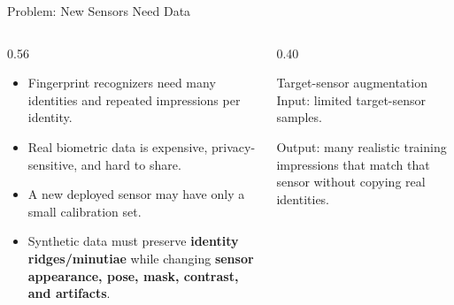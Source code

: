 \documentclass[aspectratio=169,10pt]{beamer}
\newcommand{\key}[1]{\textcolor{Accent}{\textbf{#1}}}
\begin{document}
\begin{frame}{Problem: New Sensors Need Data}
  \begin{columns}[T,onlytextwidth]
    \begin{column}{0.56\textwidth}
      \begin{itemize}
        \item Fingerprint recognizers need many identities and repeated
        impressions per identity.
        \item Real biometric data is expensive, privacy-sensitive, and hard to
        share.
        \item A new deployed sensor may have only a small calibration set.
        \item Synthetic data must preserve \key{identity ridges/minutiae} while
        changing \key{sensor appearance, pose, mask, contrast, and artifacts}.
      \end{itemize}
    \end{column}
    \begin{column}{0.40\textwidth}
      \begin{block}{Target-sensor augmentation}
        Input: limited target-sensor samples.

        Output: many realistic training impressions that match that sensor
        without copying real identities.
      \end{block}
    \end{column}
  \end{columns}
\end{frame}
\end{document}
